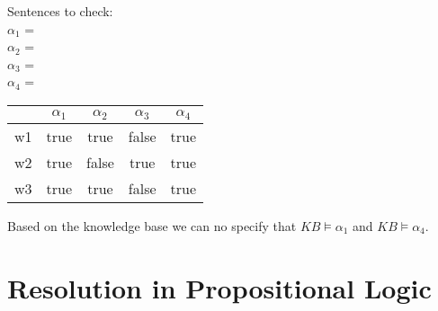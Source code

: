 \documentclass[paper=a4, fontsize=11pt]{scrartcl} %
\numberwithin{equation}{section} %
\numberwithin{figure}{section} %
\numberwithin{table}{section} %
\begin{document}
\begin{enumerate}
	Sentences to check:\\
	$\alpha_1$ = \\
	$\alpha_2$ = \\
	$\alpha_3$ = \\
	$\alpha_4$ = \\
	

	\begin{tabular}{c | c c c c}
		\hline
		 & $\alpha_1$ & $\alpha_2$ & $\alpha_3$ & $\alpha_4$ \\
		\hline
		w1	&true	&true	&false	&true \\
		w2	&true	&false	&true	&true \\
		w3 	&true	&true	&false	&true
	\end{tabular}

	Based on the knowledge base we can no specify that $\textit{KB} \models \alpha_1$ and $\textit{KB} \models \alpha_4$.

\end{enumerate}

\section{Resolution in Propositional Logic}
\end{document}
